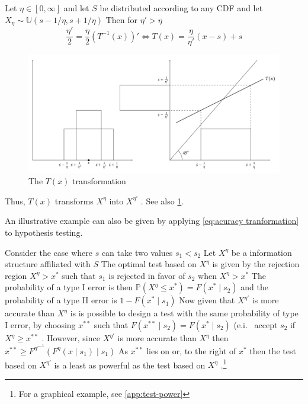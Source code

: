 \documentclass[10pt,a4paper]{article} 					%
\begin{document}
\begin{example}\label{ex:t-transformation-1}
Let  \(\eta\in[0,\infty]\) and let \(S\) be distributed according to any CDF and let \(X_{\eta}\sim\mathbb{U}(s-1/\eta,s+1/\eta)\)  Then for \(\eta'>\eta\) \[
\frac{\eta'}{2}=\frac{\eta}{2}\left(T^{-1}(x)\right)'\Leftrightarrow T(x)=\frac{\eta}{\eta'}(x-s)+s
\]
\begin{figure}
	\includegraphics[width=\textwidth]{../fig/t-transformation.pdf}
	\caption{\label{fig:t-transformation}The \(T(x)\) transformation}
\end{figure}

Thus, \(T(x)\) transforms \(X^{\eta}\) into \(X^{\eta'}\) \citep{Persico1996}. See also \cref{fig:t-transformation}.
\end{example}
An illustrative example can also be given by applying \cref{eq:acuracy tranformation} to hypothesis testing.

\begin{example}\label{ex:t-transformation-2}
Consider the case where \(s\) can take two values \(s_{1}<s_{2}\)  Let \(X^{\eta}\) be a information structure affiliated with \(S\)  The optimal test based on \(X^{\eta}\) is given by the rejection region \(X^{\eta}>x^{*}\)  such that \(s_{1}\) is rejected in favor of \(s_{2}\) when \(X^{\eta}>x^{*}\)  The probability of a type I error is then \(\mathbb{P}(X^{\eta}\le x^{*})=F(x^{*}\mid s_{2})\) and the probability of a type II error is \(1-F(x^{*}\mid s_{1})\)  Now given that \(X^{\eta'}\) is more accurate than \(X^{\eta}\) is is possible to design a test with the same probability of type I error, by choosing \(x^{**}\) such that \(F(x^{**}\mid s_{2})=F(x^{*}\mid s_{2})\) (e.i. \ accept \(s_{2}\) if \(X^{\eta}\ge x^{**}\) . However, since \(X^{\eta'}\) is more accurate than \(X^{\eta}\)  then \(x^{**}\ge F^{\eta'^{-1}}(F^{\eta}(x\mid s_{1})\mid s_{1})\)  As \(x^{**}\) lies on or, to the right of \(x^{*}\) then the test based on \(X^{\eta'}\) is a least as powerful as the test based on \(X^{\eta}\) \citep{Lehmann1988,Persico2000}.\footnote{For a graphical example, see \cref{app:test-power}}
\end{example}
\end{document}
